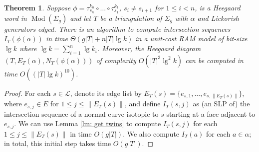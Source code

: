 \documentclass[11pt]{amsart}
\DeclareMathOperator{\Mod}{Mod}
\numberwithin{equation}{section}
\theoremstyle{plain}
\newtheorem{theorem}[equation]{Theorem}
\theoremstyle{definition}
\begin{document}
\begin{theorem}\label{th: word to diagram}
    Suppose $\phi=\tau^{k_n}_{s_n}\circ \dots \circ \tau^{k_1}_{s_1}$, $s_i\neq s_{i+1}$ for $1\leq i< n$, is a Heegaard word in $\Mod(\Sigma_g)$ and let $T$ be a triangulation of $\Sigma_g$ with $\alpha$ and Lickorish generators edged. 
    There is an algorithm to compute intersection sequences $I_{T}(\phi(\alpha))$ in time $\Theta(g|T|+n|T|\lg k)$ in a unit-cost RAM model of bit-size $\lg k$ where $\lg k = \sum_{i=1}^n \lg k_i$. 
    Moreover, the Heegaard diagram $(T, E_{T}(\alpha),N_{T}(\phi(\alpha)))$ of complexity $O(|T|^3\lg^2 k)$ can be computed in time $O((|T|\lg k)^{10})$.
\end{theorem}
\begin{proof}
   For each $s\in \mathcal{L}$, denote its edge list by $E_T(s)=\{e_{s,1},\dots,e_{s,\|E_T(s)\|}\}$, where $e_{s,j}\in E$ for $1\leq j\leq \|E_T(s)\|$, and define $I_T(s,j)$ as (an SLP of) the intersection sequence of a normal curve isotopic to $s$ starting at a face adjacent to $e_{s,j}$. 
   We can use Lemma \ref{lm: get twins} to compute $I_T(s,j)$ for each $1\leq j\leq  \|E_T(s)\|$ in time $O(g|T|)$.
   We also compute $I_T(a)$ for each $a\in\alpha$; in total, this initial step takes time $O(g|T|)$. 
   

\end{proof}
\end{document}
